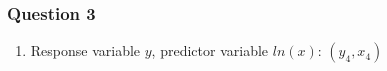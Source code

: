 \documentclass{article}
\providecommand{\tightlist}{%
      \setlength{\itemsep}{0pt}\setlength{\parskip}{0pt}}
\begin{document}
\newpage
    \subsubsection{Question 3}\label{question-3}

\begin{enumerate}
\def\labelenumi{\alph{enumi})}
\tightlist
\item
  Response variable \(y\), predictor variable \(ln(x)\): \((y_4, x_4)\)
  
  \begin{figure}[!h]
  \begin{floatrow}
   

\end{floatrow}
\end{figure}
\end{enumerate}
\end{document}

